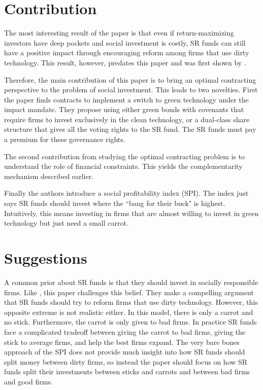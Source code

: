 \documentclass[12pt]{article}
\begin{document}
\section{Contribution}

The most interesting result of the paper is that even if return-maximizing investors have deep pockets and social investment is costly, SR funds can still have a positive impact through encouraging reform among firms that use dirty technology. This result, however, predates this paper and was first shown by \citet{chowdhry_davies_waters_2019}.

Therefore, the main contribution of this paper is to bring an optimal contracting perspective to the problem of social investment. This leads to two novelties. First the paper finds contracts to implement a switch to green technology under the impact mandate. They propose using either green bonds with covenants that require firms to invest exclusively in the clean technology, or a dual-class share structure that gives all the voting rights to the SR fund. The SR funds must pay a premium for these governance rights.

The second contribution from studying the optimal contracting problem is to understand the role of financial constraints. This yields the complementarity mechanism described earlier.

Finally the authors introduce a social profitability index (SPI). The index just says SR funds should invest where the ``bang for their buck" is highest. Intuitively, this means investing in firms that are almost willing to invest in green technology but just need a small carrot.


\section{Suggestions}

A common prior about SR funds is that they should invest in socially responsible firms. Like \citet{chowdhry_davies_waters_2019}, this paper challenges this belief. They make a compelling argument that SR funds should try to reform firms that use dirty technology. However, this opposite extreme is not realistic either. In this model, there is only a carrot and no stick. Furthermore, the carrot is only given to bad firms. In practice SR funds face a complicated tradeoff between giving the carrot to bad firms, giving the stick to average firms, and help the best firms expand. The very bare bones approach of the SPI does not provide much insight into how SR funds should split money between dirty firms, so instead the paper should focus on how SR funds split their investments between sticks and carrots and between bad firms and good firms.
\end{document}
